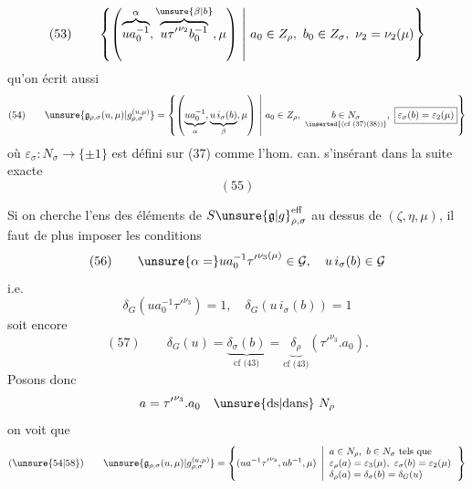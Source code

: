 
\[
(53)\qquad
\left\{\left(
\overbrace{ua_0^{-1}}^{\alpha},
\overbrace{u{\tau'}^{\nu_2}b_0^{-1}}^{\unsure{\beta|b}},
\mu\right)
\ \middle|\ a_0\in Z_\rho,\ b_0\in Z_\sigma,\
\nu_2=\nu_2(\mu)\right\}
\]
\inserted{\[
\bigl(=(ua_0^{-1},ub^{-1},\mu)\unsure{\}}
\quad\text{où}\quad b=b_0{\tau'}^{\unsure{\nu_2}}
\]}
qu'on écrit aussi
\[
(54)\qquad
\unsure{\mathfrak{g}_{\rho,\sigma}(u,\mu)|g_{\rho,\sigma}^{(u,\mu)}}
=
\left\{\left(
\underbrace{ua_0^{-1}}_{\alpha},
\underbrace{u\,i_\sigma(b)}_{\beta},
\mu\right)
\ \middle|\ 
a_0\in Z_\rho,\ 
\underset{\inserted{\text{(cf (37)(38))}}}{b\in N_\sigma},\
\boxed{\varepsilon_\sigma(b)=\varepsilon_2(\mu)}
\right\}
\]
où \(\varepsilon_\sigma:N_\sigma\longrightarrow\{\pm1\}\)
est défini sur (37) comme l'hom. can.
s'insérant dans la suite exacte
\[
(55)
\]
\diagram{\begin{tikzcd}[ampersand replacement=\&]
1\arrow[r]\&Z_\sigma\arrow[r]\&N_\sigma
\arrow[r,"\varepsilon_\sigma"]\&
\underbrace{\{\pm1\}}_{\simeq\{1,\tau'\}}\arrow[r]\&1.
\end{tikzcd}}

Si on cherche l'ens des éléments de
\(S\unsure{\mathfrak{g}|g}_{\rho,\sigma}^{\mathrm{eff}}\)
au dessus de \((\zeta,\eta,\mu)\), il faut de plus
imposer les conditions
\[
(56)\qquad
\unsure{\alpha=}ua_0^{-1}{\tau'}^{\nu_3(\mu)}\in\mathcal{G},
\quad u\,i_\sigma(b)\in\mathcal{G}
\]
i.e.
\[
\delta_G(ua_0^{-1}{\tau'}^{\nu_3})=1,\quad
\delta_G(u\,i_\sigma(b))=1
\]
soit encore
\[
(57)\qquad
\delta_G(u)=
\underbrace{\delta_\sigma(b)}_{\text{cf (43)}}
=
\underbrace{\delta_\rho}_{\text{cf (43)}}
({\tau'}^{\nu_3}.a_0).
\]
Posons donc
\[
a={\tau'}^{\nu_3}.a_0\quad\text{\unsure{ds|dans}}\ N_\rho
\]
on voit que
\[
(\unsure{54|58})\qquad
\unsure{\mathfrak{g}_{\rho,\sigma}(u,\mu)|g_{\rho,\sigma}^{(u,\mu)}}
=
\left\{(ua^{-1}{\tau'}^{\nu_3},ub^{-1},\mu)\ \left|
\begin{array}{l}
a\in N_\rho,\ b\in N_\sigma\ \text{tels que}\\
\varepsilon_\rho(a)=\varepsilon_3(\mu),\
\varepsilon_\sigma(b)=\varepsilon_2(\mu)\\
\delta_\rho(a)=\delta_\sigma(b)=\delta_G(u)
\end{array}\right.\right\}
\]

